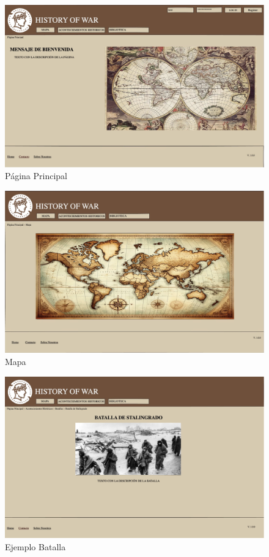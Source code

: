\documentclass{article}
\begin{document}
\begin{figure}[H]
    \centering
    \includegraphics[width=1\textwidth]{Mockup/PaginaPrincipal (1).jpg}
    \caption{Página Principal}
    \label{fig:mi_imagen}
\end{figure}

\begin{figure}[H]
    \centering
    \includegraphics[width=1\textwidth]{Mockup/MapaMockup.jpg}
    \caption{Mapa}
    \label{fig:mi_imagen}
\end{figure}

\begin{figure}[H]
    \centering
    \includegraphics[width=1\textwidth]{Mockup/EjemploBatallaMockup.jpg}
    \caption{Ejemplo Batalla}
    \label{fig:mi_imagen}
\end{figure}
\end{document}
